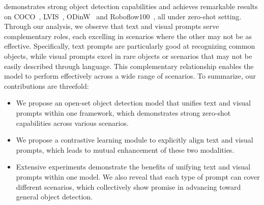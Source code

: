\ourmodel{} demonstrates strong object detection capabilities and achieves remarkable results on COCO~\cite{lin2014microsoft}, LVIS~\cite{gupta2019lvis}, ODinW~\cite{li2022elevater} and Roboflow100~\cite{ciaglia2022roboflow}, all under zero-shot setting. Through our analysis, we observe that text and visual prompts serve complementary roles, each excelling in scenarios where the other may not be as effective. Specifically, text prompts are particularly good at recognizing common objects, while visual prompts excel in rare objects or scenarios that may not be easily described through language. This complementary relationship enables the model to perform effectively across a wide range of scenarios. To summarize, our contributions are threefold:
\begin{itemize}
    \item We propose an open-set object detection model \ourmodel{} that unifies text and visual prompts within one framework, which demonstrates strong zero-shot capabilities across various scenarios.
    \item We propose a contrastive learning module to explicitly align text and visual prompts, which leads to mutual enhancement of these two modalities.
    \item Extensive experiments demonstrate the benefits of unifying text and visual prompts within one model. We also reveal that each type of prompt can cover different scenarios, which collectively show promise in advancing toward general object detection.
\end{itemize}